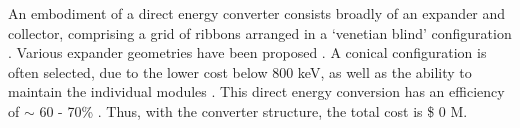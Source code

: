 \begin{table}[h]
    \centering
    \caption{Cost Table}
    \label{tab:cost-table}
\end{table}

An embodiment of a direct energy converter consists broadly of an expander and collector, comprising a grid of ribbons arranged in a `venetian blind' configuration \cite{post1970mirror}. Various expander geometries have been proposed \cite{post1970mirror}. A conical configuration is often selected, due to the lower cost below 800 keV, as well as the ability to maintain the individual modules \cite{barr1974preliminary}. This direct energy conversion has an efficiency of $\sim$ 60 - 70\% \cite{moir1973venetian}.   Thus, with the converter structure, the total cost is \$ 0 M.

